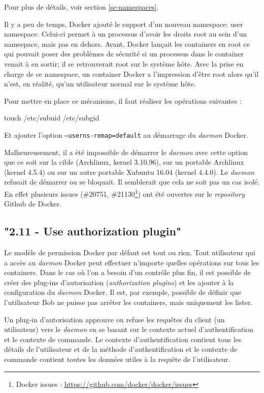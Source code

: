 \documentclass[11pt,a4paper,oneside]{report}
\newcommand{\code}[1]{\texttt{#1}}
\begin{document}
Pour plus de détails, voir section \ref{sc-namespaces}.

Il y a peu de temps, Docker ajouté le support d'un nouveau namespace\cite{docker_1_10_user_namespace}: user namespace. Celui-ci permet à un processus d'avoir les droits root au sein d'un namespace, mais pas en dehors. Avant, Docker lançait les containers en root ce qui pouvait poser des problèmes de sécurité si un processus dans le container venait à en sortir; il se retrouverait root sur le système hôte. Avec la prise en charge de ce namespace, un container Docker a l'impression d'être root alors qu'il n'est, en réalité, qu'un utilisateur normal sur le système hôte.

Pour mettre en place ce mécanisme, il faut réaliser les opérations suivantes :

\begin{bashcode}
touch /etc/subuid /etc/subgid
\end{bashcode}

Et ajouter l'option \code{--userns-remap=default} au démarrage du \textit{daemon} Docker.

Malheureusement, il a été impossible de démarrer le \textit{daemon} avec cette option que ce soit sur la cible (Archlinux, kernel 3.10.96), sur un portable Archlinux (kernel 4.5.4) ou sur un autre portable Xubuntu 16.04 (kernel 4.4.0). Le \textit{daemon} refusait de démarrer ou se bloquait. Il semblerait que cela ne soit pas un cas isolé. En effet plusieurs issues (\#20751, \#21130\footnote{Docker issues : \url{https://github.com/docker/docker/issues}}) ont été ouvertes sur le \textit{repository} Github de Docker.


\subsection{"2.11 - Use authorization plugin"}
Le modèle de permission Docker par défaut est tout ou rien. Tout utilisateur qui a accès au \textit{daemon} Docker peut effectuer n'importe quelles opérations sur tous les containers. Dans le cas où l'on a besoin d'un contrôle plus fin, il est possible de créer des plug-ins d'autorisation (\textit{authorization plugins}) et les ajouter à la configuration du \textit{daemon} Docker. Il est, par exemple, possible de définir que l'utilisateur Bob ne puisse pas arrêter les containers, mais uniquement les lister.

Un plug-in d'autorisation approuve ou refuse les requêtes du client (un utilisateur)  vers le \textit{daemon} en se basant sur le contexte actuel d'authentification et le contexte de commande. Le contexte d'authentification contient tous les détails de l'utilisateur et de la méthode d'authentification et le contexte de commande contient toutes les données utiles à la requête de l'utilisateur.
\end{document}
